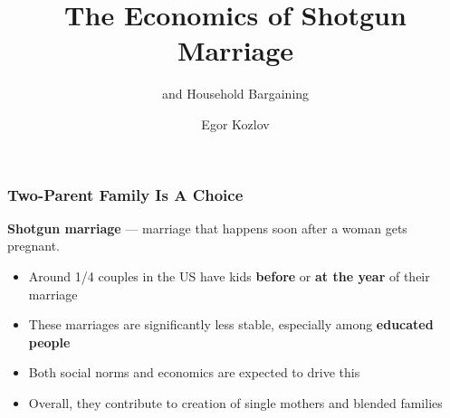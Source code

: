\documentclass[aspectratio=169]{beamer}
\title{The Economics of Shotgun Marriage}
\subtitle{and Household Bargaining}
\author{Egor Kozlov}
\institute{
  Department of Economics\\
  Northwestern University}
\let\olditem\item
\renewcommand{\item}{%
\olditem\vspace{\fill}}
\begin{document}
\begin{frame}[plain]
\addtocounter{framenumber}{-1}
\date{\scriptsize}
\titlepage
\end{frame}


\begin{frame}
\frametitle{Two-Parent Family Is A Choice}

\textbf{Shotgun marriage} --- marriage that happens soon after a woman gets pregnant.
\begin{itemize}
\item Around 1/4 couples in the US have kids \textbf{before} or \textbf{at the year} of their marriage
\item These marriages are significantly less stable, especially among \textbf{educated people} %
\item Both social norms and economics are expected to drive this
\item Overall, they contribute to creation of single mothers and blended families
\end{itemize}
\end{frame}


%
%
\end{document}
